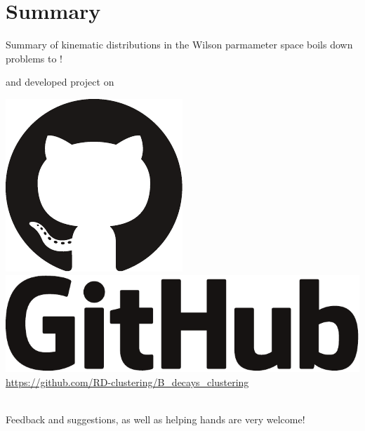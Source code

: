 \section{Summary}
\begin{frame}{Summary}
%	
%	
%	
	 of kinematic distributions in the Wilson parmameter space boils down  problems to !
	
	\bigskip
	 and  developed project on\\[2ex]
	\begin{minipage}{\linewidth}
		\includegraphics[height=2.5ex]{figures/software_logos/octocat.pdf}\hspace{0.3em}
		\includegraphics[height=2.5ex]{figures/software_logos/github.pdf}\\
		{\color{purple}\url{https://github.com/RD-clustering/B_decays_clustering}}
	\end{minipage}\\[2ex]
	Feedback and suggestions, as well as helping hands are very welcome!
\end{frame}